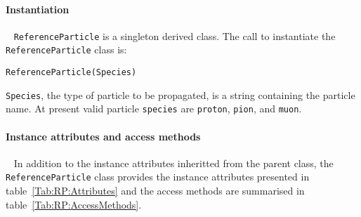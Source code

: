 \paragraph{Instantiation}  ~\newline
\noindent
\texttt{ReferenceParticle} is a singleton derived class.
The call to instantiate the \texttt{ReferenceParticle} class is:
\begin{center}
  \texttt{ReferenceParticle(Species)}
\end{center}
\texttt{Species}, the type of particle to be propagated, is a string
containing the particle name.
At present valid particle \texttt{species} are
\texttt{proton}, \texttt{pion}, and \texttt{muon}.

\paragraph{Instance attributes and access methods} ~\newline
\label{Para:BLE:InstAttr}
\noindent
In addition to the instance attributes inheritted from the parent
class, the \texttt{ReferenceParticle} class provides the instance
attributes presented in table~\ref{Tab:RP:Attributes}
and the access methods are summarised in
table~\ref{Tab:RP:AccessMethods}.
